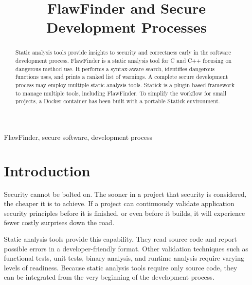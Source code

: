 \documentclass[journal]{IEEEtran}
\begin{document}

\title{FlawFinder and Secure Development Processes}

\author{
}

\maketitle



\begin{abstract}
Static analysis tools provide insights to security and correctness early in the software development
process. FlawFinder is a static analysis tool for C and C++ focusing on dangerous method use. It
performs a syntax-aware search, identifies dangerous functions uses, and prints a ranked list of
warnings. A complete secure development process may employ multiple static analysis tools. Statick
is a plugin-based framework to manage multiple tools, including FlawFinder. To simplify the workflow
for small projects, a Docker container has been built with a portable Statick environment.
\end{abstract}

\begin{IEEEkeywords}
FlawFinder, secure software, development process
\end{IEEEkeywords}



\section{Introduction}

Security cannot be bolted on. The sooner in a project that security is considered, the cheaper it is
to achieve. If a project can continuously validate application security principles before it is
finished, or even before it builds, it will experience fewer costly surprises down the road.

Static analysis tools provide this capability. They read source code and report possible errors in a
developer-friendly format. Other validation techniques such as functional tests, unit tests, binary
analysis, and runtime analysis require varying levels of readiness. Because static analysis tools
require only source code, they can be integrated from the very beginning of the development process.
\end{document}
